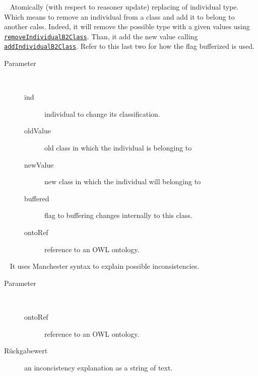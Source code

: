 \begin{description}
~ Atomically (with respect to reasoner update) replacing of individual
 type. Which means to remove an individual from a class and add it to
 belong to another calss.
 Indeed, it will remove the possible type with a given values
 using \texttt{\hyperlink{ontologyFramework.OFContextManagement.OWLLibrary.removeIndividualB2Class(org.semanticweb.owlapi.model.OWLNamedIndividual,org.semanticweb.owlapi.model.OWLClass,boolean,ontologyFramework.OFContextManagement.OWLReferences)}{removeIndividualB2Class}}.
 Than, it add the new value calling \texttt{\hyperlink{ontologyFramework.OFContextManagement.OWLLibrary.addIndividualB2Class(org.semanticweb.owlapi.model.OWLNamedIndividual,org.semanticweb.owlapi.model.OWLClass,boolean,ontologyFramework.OFContextManagement.OWLReferences)}{addIndividualB2Class}}.
 Refer to this last two for how the flag bufferized is used.
\begin{description}
\item[Parameter] ~
\begin{description}
\item[ind]
individual to change its classification.
\item[oldValue]
old class in which the individual is belonging to
\item[newValue]
new class in which the individual will belonging to
\item[buffered]
flag to buffering changes internally to this class.
\item[ontoRef]
reference to an OWL ontology.
\end{description}
\end{description}
\item[{\ltdHypertarget{ontologyFramework.OFContextManagement.OWLLibrary.getPelletExplanation(ontologyFramework.OFContextManagement.OWLReferences)}{getPelletExplanation}\label{ontologyFramework.OFContextManagement.OWLLibrary.getPelletExplanation(ontologyFramework.OFContextManagement.OWLReferences)}}]
~ It uses Manchester syntax to explain possible inconsistencies.
\begin{description}
\item[Parameter] ~
\begin{description}
\item[ontoRef]
reference to an OWL ontology.
\end{description}
\item[Rückgabewert] 
an inconcistency explanation as a string of text.
\end{description}
\end{description}
